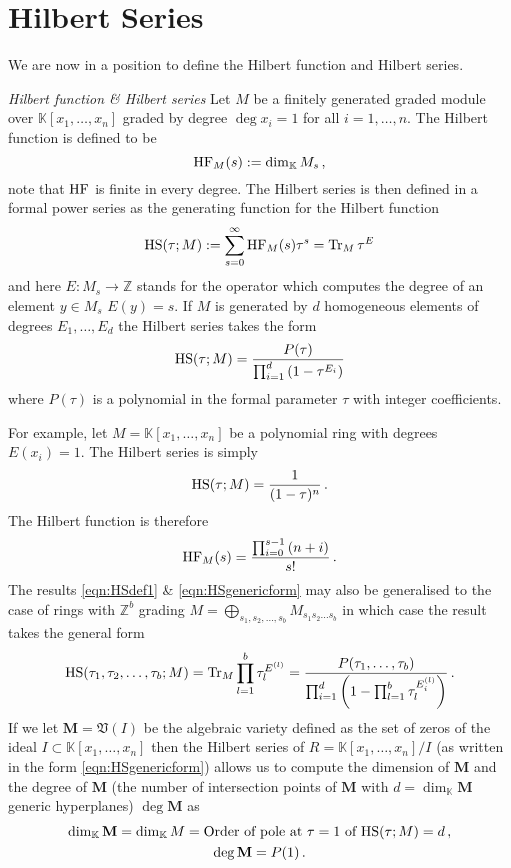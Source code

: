 \documentclass[main.tex]{subfiles}
\begin{document}
\section{Hilbert Series}\label{app:HS}
We are now in a position to define the Hilbert function and Hilbert series.
\begin{definition}{\textit{Hilbert function \& Hilbert series}}
Let $M$ be a finitely generated graded module over $\mathbb{K}[x_1,\dots,x_n]$ graded by degree $\deg x_i=1$ for all $i=1,\dots,n$. The Hilbert function is defined to be
\begin{equation}
\textrm{HF}_M(s):=\dim_{\mathbb{K}} M_s\,,
\end{equation}
note that $\textrm{HF}$ is finite in every degree.
The Hilbert series is then defined in a formal power series as the generating function for the Hilbert function
\begin{equation}\label{eqn:HSdef1}
\textrm{HS}(\tau;M):=\sum_{s=0}^{\infty}\textrm{HF}_M(s)\tau^s=\operatorname{Tr}_M\tau^E
\end{equation}
and here $E:M_s\to\mathbb{Z}$ stands for the operator which computes the degree of an element $y\in M_s$ $E(y)=s$. If $M$ is generated by $d$ homogeneous elements of degrees $E_1,\dots, E_d$ the Hilbert series takes the form
\begin{equation}\label{eqn:HSgenericform}
\textrm{HS}(\tau;M)=\frac{P(\tau)}{\prod_{i=1}^d\left(1-\tau^{E_i}\right)}
\end{equation}
where $P(\tau)$ is a polynomial in the formal parameter $\tau$ with integer coefficients.
\end{definition}
For example, let $M=\mathbb{K}[x_1,\dots,x_n]$ be a polynomial ring with degrees $E(x_i)=1$. The Hilbert series is simply
\begin{equation}
\textrm{HS}(\tau;M)=\frac{1}{(1-\tau)^n}\,.
\end{equation}
The Hilbert function is therefore
\begin{equation}
\textrm{HF}_M(s)=\frac{\prod_{i=0}^{s-1}{(n+i)}}{s!}\,.
\end{equation}
The results \eqref{eqn:HSdef1} \& \eqref{eqn:HSgenericform} may also be generalised to the case of rings with $\mathbb{Z}^b$ grading $M=\bigoplus_{s_1,s_2,\dots,s_b}M_{s_1s_2\dots s_b}$ in which case the result takes the general form
\begin{equation}
\textrm{HS}(\tau_1,\tau_2,\dots,\tau_b;M)=\operatorname{Tr}_M\prod_{l=1}^b\tau_l^{E^{(l)}}=\frac{P(\tau_1,\dots,\tau_b)}{\prod_{i=1}^d\left(1-\prod_{l=1}^b\tau_l^{E^{(l)}_i}\right)}\,.
\end{equation}
If we let $\mathbf{M}=\mathfrak{V}(I)$ be the algebraic variety defined as the set of zeros of the ideal $I\subset \mathbb{K}[x_1,\dots,x_n]$ then the Hilbert series of $R=\mathbb{K}[x_1,\dots,x_n]/I$ (as written in the form \eqref{eqn:HSgenericform}) allows us to compute the dimension of $\mathbf{M}$ and the degree of $\mathbf{M}$ (the number of intersection points of $\mathbf{M}$ with $d=\dim_{\mathbb{K}}\mathbf{M}$ generic hyperplanes) $\deg \mathbf{M}$ as
\begin{gather}
\dim_{\mathbb{K}} \mathbf{M}=\dim_{\mathbb{K}} M=\text{Order of pole at $\tau=1$ of $\textrm{HS}(\tau;M)$}=d\,,\\
\deg \mathbf{M}= P(1)\,.
\end{gather}
\end{document}

